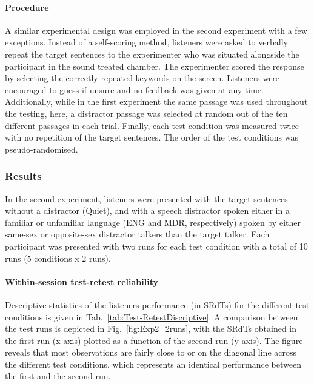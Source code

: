 \documentclass[a4paper, twoside]{templates/ociamthesis}
\begin{document}
\hypertarget{procedure-1}{%
\paragraph{Procedure}\label{procedure-1}}

A similar experimental design was employed in the second experiment with a few exceptions. Instead of a self-scoring method, listeners were asked to verbally repeat the target sentences to the experimenter who was situated alongside the participant in the sound treated chamber. The experimenter scored the response by selecting the correctly repeated keywords on the screen. Listeners were encouraged to guess if unsure and no feedback was given at any time. Additionally, while in the first experiment the same passage was used throughout the testing, here, a distractor passage was selected at random out of the ten different passages in each trial. Finally, each test condition was measured twice with no repetition of the target sentences. The order of the test conditions was pseudo-randomised.\\

\hypertarget{results-1}{%
\subsubsection{Results}\label{results-1}}

In the second experiment, listeners were presented with the target sentences without a distractor (Quiet), and with a speech distractor spoken either in a familiar or unfamiliar language (ENG and MDR, respectively) spoken by either same-sex or opposite-sex distractor talkers than the target talker. Each participant was presented with two runs for each test condition with a total of 10 runs (5 conditions x 2 runs).\\

\hypertarget{within-session-test-retest-reliability}{%
\paragraph{Within-session test-retest reliability}\label{within-session-test-retest-reliability}}

Descriptive statistics of the listeners performance (in SRdTs) for the different test conditions is given in Tab.~\ref{tab:Test-RetestDiscriptive}. A comparison between the test runs is depicted in Fig.~\ref{fig:Exp2_2runs}, with the SRdTs obtained in the first run (x-axis) plotted as a function of the second run (y-axis). The figure reveals that most observations are fairly close to or on the diagonal line across the different test conditions, which represents an identical performance between the first and the second run.\\
\end{document}
